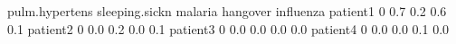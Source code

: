 \begin{Schunk}
% --begin: "comp.circ.unavoid"
\begin{Soutput}
         pulm.hypertens sleeping.sickn malaria hangover influenza
patient1              0            0.7     0.2      0.6       0.1
patient2              0            0.0     0.2      0.0       0.1
patient3              0            0.0     0.0      0.0       0.0
patient4              0            0.0     0.0      0.1       0.0
\end{Soutput}
%
% --end: "comp.circ.unavoid"
\end{Schunk}
